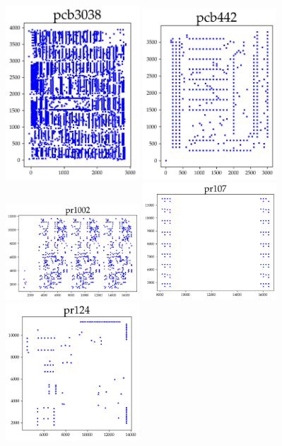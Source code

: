 \begin{appendices}
\begin{figure}[H]
\centering
\includegraphics[width=5cm]{../tsplib_euc2d_pictures_of_instances/pcb3038.png}
\includegraphics[width=5cm]{../tsplib_euc2d_pictures_of_instances/pcb442.png}
\includegraphics[width=5cm]{../tsplib_euc2d_pictures_of_instances/pr1002.png}
\includegraphics[width=5cm]{../tsplib_euc2d_pictures_of_instances/pr107.png}
\includegraphics[width=5cm]{../tsplib_euc2d_pictures_of_instances/pr124.png}

\end{figure}
\end{appendices}
